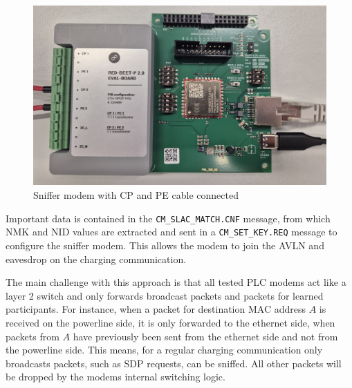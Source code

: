 \documentclass[sigconf]{acmart}
\begin{document}
\begin{figure}[ht]
    \centering
    \includegraphics[width=1\linewidth]{graphics/RedBeet-EV.jpg}
    \caption{Sniffer modem with CP and PE cable connected}
    \label{fig:redbeet}
\end{figure}

Important data is contained in the \texttt{CM\_SLAC\_MATCH.CNF} message, from which NMK and NID values are extracted and sent in a \texttt{CM\_SET\_KEY.REQ} message to configure the sniffer modem. This allows the modem to join the AVLN and eavesdrop on the charging communication.


The main challenge with this approach is that all tested PLC modems act like a layer 2 switch and only forwards broadcast packets and packets for learned participants. For instance, when a packet for destination MAC address $A$ is received on the powerline side, it is only forwarded to the ethernet side, when packets from $A$ have previously been sent from the ethernet side and not from the powerline side.
This means, for a regular charging communication only broadcasts packets, such as SDP requests, can be sniffed. All other packets will be dropped by the modems internal switching logic.
\end{document}
